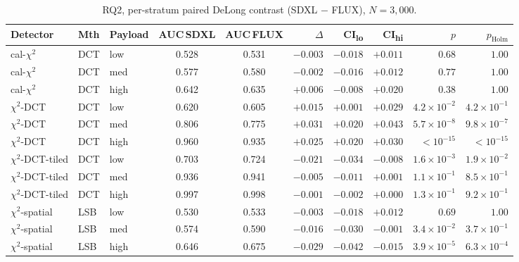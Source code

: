 \documentclass[10pt,twocolumn,a4paper]{article}
\begin{document}
\begin{table}[h]
\centering\footnotesize
\caption{RQ2, per-stratum paired DeLong contrast (SDXL $-$ FLUX), $N\!=\!3{,}000$.}
\label{tab:appendix-rq2}
\setlength{\tabcolsep}{4pt}\renewcommand{\arraystretch}{1.1}
\begin{tabular}{@{}l l l c c r r r r r@{}}
\toprule
\textbf{Detector} & \textbf{Mth} & \textbf{Payload} & \textbf{AUC\,SDXL} & \textbf{AUC\,FLUX} & \textbf{$\Delta$} & \textbf{CI\textsubscript{lo}} & \textbf{CI\textsubscript{hi}} & \textbf{$p$} & \textbf{$p_\text{Holm}$} \\
\midrule
cal-$\chi^2$         & DCT & low    & 0.528 & 0.531 & $-0.003$ & $-0.018$ & $+0.011$ & $0.68$  & $1.00$ \\
cal-$\chi^2$         & DCT & med    & 0.577 & 0.580 & $-0.002$ & $-0.016$ & $+0.012$ & $0.77$  & $1.00$ \\
cal-$\chi^2$         & DCT & high   & 0.642 & 0.635 & $+0.006$ & $-0.008$ & $+0.020$ & $0.38$  & $1.00$ \\
$\chi^2$-DCT         & DCT & low    & 0.620 & 0.605 & $+0.015$ & $+0.001$ & $+0.029$ & $4.2\!\times\!10^{-2}$  & $4.2\!\times\!10^{-1}$ \\
$\chi^2$-DCT         & DCT & med    & 0.806 & 0.775 & $+0.031$ & $+0.020$ & $+0.043$ & $5.7\!\times\!10^{-8}$  & $9.8\!\times\!10^{-7}$ \\
$\chi^2$-DCT         & DCT & high   & 0.960 & 0.935 & $+0.025$ & $+0.020$ & $+0.030$ & $<\!10^{-15}$            & $<\!10^{-15}$ \\
$\chi^2$-DCT-tiled   & DCT & low    & 0.703 & 0.724 & $-0.021$ & $-0.034$ & $-0.008$ & $1.6\!\times\!10^{-3}$  & $1.9\!\times\!10^{-2}$ \\
$\chi^2$-DCT-tiled   & DCT & med    & 0.936 & 0.941 & $-0.005$ & $-0.011$ & $+0.001$ & $1.1\!\times\!10^{-1}$  & $8.5\!\times\!10^{-1}$ \\
$\chi^2$-DCT-tiled   & DCT & high   & 0.997 & 0.998 & $-0.001$ & $-0.002$ & $+0.000$ & $1.3\!\times\!10^{-1}$  & $9.2\!\times\!10^{-1}$ \\
$\chi^2$-spatial     & LSB & low    & 0.530 & 0.533 & $-0.003$ & $-0.018$ & $+0.012$ & $0.69$  & $1.00$ \\
$\chi^2$-spatial     & LSB & med    & 0.574 & 0.590 & $-0.016$ & $-0.030$ & $-0.001$ & $3.4\!\times\!10^{-2}$  & $3.7\!\times\!10^{-1}$ \\
$\chi^2$-spatial     & LSB & high   & 0.646 & 0.675 & $-0.029$ & $-0.042$ & $-0.015$ & $3.9\!\times\!10^{-5}$  & $6.3\!\times\!10^{-4}$ \\

\end{tabular}
\end{table}
\end{document}
